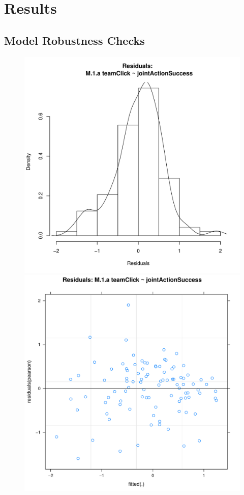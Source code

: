 {\section{\label{app5:results}Results}
\subsection{\label{app5:modelRobustness}Model Robustness Checks}


\begin{figure}[htbp]
    \includegraphics[scale =.4]{images/MLM1aHist.pdf}
    \includegraphics[scale =.4]{images/MLM1aScatter.pdf}

\end{figure}}
